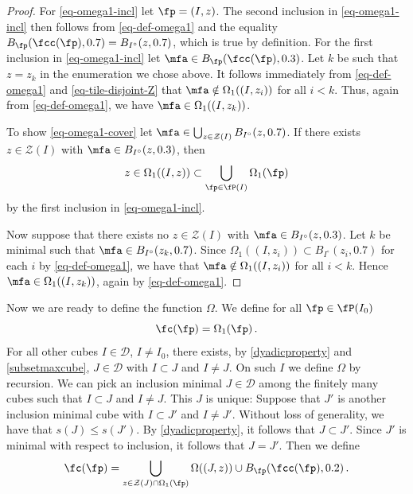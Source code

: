 \begin{proof}
    \leanok
    For \eqref{eq-omega1-incl} let $\fp = (I, z)$.
    The second inclusion in \eqref{eq-omega1-incl} then follows from \eqref{eq-def-omega1} and the equality $B_{\fp}(\fcc(\fp), 0.7) = B_{I^\circ}(z, 0.7)$, which is true by definition.
    For the first inclusion in \eqref{eq-omega1-incl} let $\mfa \in B_{\fp}(\fcc(\fp),0.3)$. Let $k$ be such that $z = z_k$ in the enumeration we chose above. It follows immediately from \eqref{eq-def-omega1} and \eqref{eq-tile-disjoint-Z} that
    $\mfa \notin \Omega_1((I, z_i))$ for all $i < k$. Thus, again from \eqref{eq-def-omega1}, we have
    $\mfa \in \Omega_1((I,z_k))$.

    To show \eqref{eq-omega1-cover} let $\mfa \in \bigcup_{z \in \mathcal{Z}(I)} B_{I^\circ}(z,0.7)$.
    If there exists $z \in \mathcal{Z}(I)$ with $\mfa \in B_{I^\circ}(z,0.3)$, then
    $$
        z \in \Omega_1((I, z)) \subset \bigcup_{\fp \in \fP(I)} \Omega_1(\fp)
    $$
    by the first inclusion in \eqref{eq-omega1-incl}.

    Now suppose that there exists no $z \in \mathcal{Z}(I)$ with $\mfa \in B_{I^\circ}(z, 0.3)$. Let $k$ be minimal such that $\mfa \in B_{I^\circ}(z_k, 0.7)$. Since $\Omega_1((I, z_i)) \subset B_{I^\circ}(z_i, 0.7)$ for each $i$ by \eqref{eq-def-omega1}, we have that $\mfa \notin \Omega_1((I, z_i))$ for all $i < k$. Hence $\mfa \in \Omega_1((I, z_k))$, again by \eqref{eq-def-omega1}.
\end{proof}

Now we are ready to define the function $\Omega$. We define for all $\fp \in \fP(I_0)$
\begin{equation}
    \label{eq-max-omega}
    \fc(\fp) = \Omega_1(\fp)\,.
\end{equation}
For all other cubes $I \in \mathcal{D}$, $I \ne I_0$, there exists, by \eqref{dyadicproperty} and \eqref{subsetmaxcube}, $J \in \mathcal{D}$ with $I \subset J$ and $I \ne J$. On such $I$ we define $\Omega$ by recursion. We can pick an inclusion minimal $J \in \mathcal{D}$ among the finitely many cubes such that $I \subset J$ and $I \ne J$. This $J$ is unique: Suppose that $J'$ is another inclusion minimal cube with $I \subset J'$ and $I \ne J'$. Without loss of generality, we have that $s(J) \le s(J')$. By \eqref{dyadicproperty}, it follows that $J \subset J'$. Since $J'$ is minimal with respect to inclusion, it follows that $J = J'$. Then we define
\begin{equation}
    \label{eq-it-omega}
    \fc(\fp) = \bigcup_{z \in \mathcal{Z}(J) \cap \Omega_1(\fp)} \Omega((J, z)) \cup B_{\fp}(\fcc(\fp),0.2)\,.
\end{equation}

